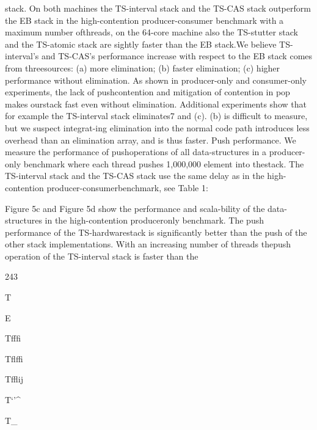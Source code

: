 stack. On both machines the TS-interval stack and the TS-CAS stack outperform the EB stack in the high-contention
producer-consumer benchmark with a maximum number ofthreads, on the 64-core machine also the TS-stutter stack
and the TS-atomic stack are sightly faster than the EB stack.We believe TS-interval's and TS-CAS's performance increase with respect to the EB stack comes from threesources: (a) more elimination; (b) faster elimination; (c)
higher performance without elimination. As shown in producer-only and consumer-only experiments, the lack of pushcontention and mitigation of contention in pop makes ourstack fast even without elimination. Additional experiments
show that for example the TS-interval stack eliminates7%
and (c). (b) is difficult to measure, but we suspect integrat-ing elimination into the normal code path introduces less
overhead than an elimination array, and is thus faster.
Push performance. We measure the performance of pushoperations of all data-structures in a producer-only benchmark where each thread pushes 1,000,000 element into thestack. The TS-interval stack and the TS-CAS stack use
the same delay as in the high-contention producer-consumerbenchmark, see Table 1:

Figure 5c and Figure 5d show the performance and scala-bility of the data-structures in the high-contention produceronly benchmark. The push performance of the TS-hardwarestack is significantly better than the push of the other stack
implementations. With an increasing number of threads thepush operation of the TS-interval stack is faster than the

243

T\Gamma \Delta \Theta \Lambda \Delta \Gamma  \Xi \Pi \Sigma \Upsilon \Phi 

E\Psi  \Xi \Pi \Sigma \Upsilon \Phi 

T\Xi \Omega \Sigma \Pi fffi\Theta \Upsilon  \Xi \Pi \Sigma \Upsilon \Phi 

T\Xi \Omega flffi\Xi  \Xi \Pi \Sigma \Upsilon \Phi 

T\Xi \Omega ffl\Sigma \Gamma ij\Sigma \Gamma \Delta  \Xi \Pi \Sigma \Upsilon \Phi 

T\Xi \Omega \Theta `\Pi \Delta \Gamma '\Sigma ^ \Xi \Pi \Sigma \Upsilon \Phi 

T\Xi \Omega *\Pi _\Pi \Pi \Delta \Gamma  \Xi \Pi \Sigma \Upsilon \Phi 


